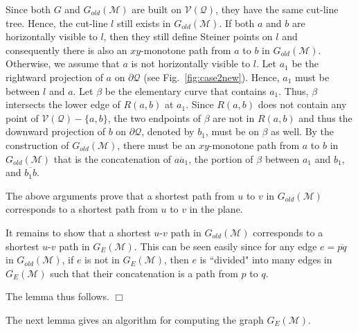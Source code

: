 \documentclass[english,runningheads,11pt]{llncs}
\def\calM{\mathcal{M}}
\def\calQ{\mathcal{Q}}
\def\calV{\mathcal{V}}
\newenvironment{proof}{\noindent {\textbf{Proof:}}\rm}{\hfill $\Box$\rm}
\begin{document}
\begin{proof}
\begin{enumerate}
Since both $G$ and $G_{old}(\calM)$ are built on $\calV(\calQ)$, they have the same cut-line tree.
Hence, the cut-line $l$ still exists in $G_{old}(\calM)$. If
both $a$ and $b$ are horizontally visible to $l$, then they still
define Steiner points on $l$ and consequently there is also
an $xy$-monotone path from $a$ to $b$ in $G_{old}(\calM)$. Otherwise, we
assume that $a$ is not horizontally visible to $l$. Let $a_1$ be the
rightward projection of $a$ on $\partial\calQ$ (see
Fig.~\ref{fig:case2new}). Hence, $a_1$ must be
between $l$ and $a$. Let $\beta$ be the elementary curve that contains
$a_1$. Thus, $\beta$ intersects the lower edge of $R(a,b)$ at $a_1$.
Since $R(a,b)$ does not contain any point of $\calV(\calQ)-\{a,b\}$,
the two endpoints of $\beta$ are not in
$R(a,b)$ and thus the downward projection of $b$ on $\partial\calQ$,
denoted by $b_1$, must be on $\beta$ as well. By the
construction of $G_{old}(\calM)$, there must be an $xy$-monotone path
from $a$ to $b$ in $G_{old}(\calM)$ that is the concatenation of
$\overline{aa_1}$, the portion of $\beta$ between $a_1$ and $b_1$, and
$\overline{b_1b}$.
\end{enumerate}

The above arguments prove that a shortest path from $u$ to $v$ in
$G_{old}(\calM)$ corresponds to a shortest path from $u$ to $v$ in the
plane.

It remains to show
that a shortest $u$-$v$ path in $G_{old}(\calM)$ corresponds
to a shortest $u$-$v$ path in $G_E(\calM)$. This can be
seen easily since for any edge $e=\overline{pq}$ in $G_{old}(\calM)$,
if $e$ is not
in $G_E(\calM)$, then $e$ is ``divided" into many edges in $G_E(\calM)$ such
that their concatenation is a path from $p$ to $q$.

The lemma thus follows.
\end{proof}

The next lemma gives an algorithm for computing the graph $G_E(\calM)$.
\end{document}
